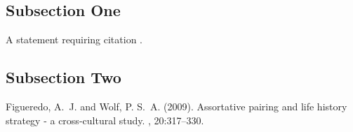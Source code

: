 \documentclass[twoside, column]{article}
\begin{document}
\subsection{Subsection One}

A statement requiring citation \cite{Figueredo:2009dg}.
\blindtext %

\subsection{Subsection Two}

\blindtext %


\begin{thebibliography}{99} %

Figueredo, A.~J. and Wolf, P. S.~A. (2009).
\newblock Assortative pairing and life history strategy - a cross-cultural
  study.
, 20:317--330.
 
\end{thebibliography}

\end{document}
